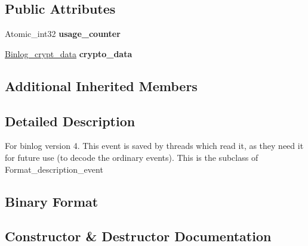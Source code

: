 \subsection*{Public Attributes}
\begin{DoxyCompactItemize}
\item 
\mbox{\label{classFormat__description__log__event_a7362dcc6970913d85f379523b2417f18}} 
Atomic\+\_\+int32 {\bfseries usage\+\_\+counter}
\item 
\mbox{\label{classFormat__description__log__event_aae97ddbe81ce0dc0512431735aa84fa6}} 
\mbox{\hyperlink{classBinlog__crypt__data}{Binlog\+\_\+crypt\+\_\+data}} {\bfseries crypto\+\_\+data}
\end{DoxyCompactItemize}
\subsection*{Additional Inherited Members}


\subsection{Detailed Description}
For binlog version 4. This event is saved by threads which read it, as they need it for future use (to decode the ordinary events). This is the subclass of Format\+\_\+description\+\_\+event\hypertarget{classFormat__description__log__event_Format_description_log_event_binary_format}{}\subsection{Binary Format}\label{classFormat__description__log__event_Format_description_log_event_binary_format}


\subsection{Constructor \& Destructor Documentation}
\mbox{\label{classFormat__description__log__event_a16479166b988fa107634b4626bc38c29}} 
